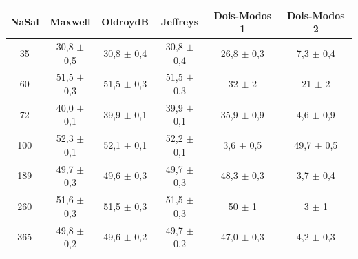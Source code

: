 		\begin{table}[h]
		{%
			\begin{tabular}{c | c c c c c}
				\toprule
				NaSal & Maxwell             & OldroydB             & Jeffreys             & Dois-Modos 1            & Dois-Modos 2            \\ \midrule
				 35   & 30,8    \(\pm\) 0,5 & 30,8     \(\pm\) 0,4 & 30,8     \(\pm\) 0,4 & 26,8        \(\pm\) 0,3 & 7,3         \(\pm\) 0,4 \\
				 60   & 51,5    \(\pm\) 0,3 & 51,5     \(\pm\) 0,3 & 51,5     \(\pm\) 0,3 & 32          \(\pm\) 2   & 21          \(\pm\) 2   \\
				 72   & 40,0    \(\pm\) 0,1 & 39,9     \(\pm\) 0,1 & 39,9     \(\pm\) 0,1 & 35,9        \(\pm\) 0,9 & 4,6         \(\pm\) 0,9 \\
				 100  & 52,3    \(\pm\) 0,1 & 52,1     \(\pm\) 0,1 & 52,2     \(\pm\) 0,1 & 3,6         \(\pm\) 0,5 & 49,7        \(\pm\) 0,5 \\
				 189  & 49,7    \(\pm\) 0,3 & 49,6     \(\pm\) 0,3 & 49,7     \(\pm\) 0,3 & 48,3        \(\pm\) 0,3 & 3,7         \(\pm\) 0,4 \\
				 260  & 51,6    \(\pm\) 0,3 & 51,5     \(\pm\) 0,3 & 51,5     \(\pm\) 0,3 & 50          \(\pm\) 1   & 3           \(\pm\) 1   \\
				 365  & 49,8    \(\pm\) 0,2 & 49,6     \(\pm\) 0,2 & 49,7     \(\pm\) 0,2 & 47,0        \(\pm\) 0,3 & 4,2         \(\pm\) 0,3 \\ \bottomrule
			\end{tabular}
		}{}
		\end{table}  
	
